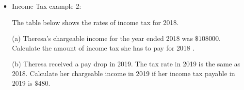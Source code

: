 \documentclass[twocolumn]{article}
\begin{document}
\begin{itemize}
(a) 

Matthew:

Tax on the first $\$ 20000=\$ 0$

Tax on the next $\$ 8500=\frac{2}{100} \times \$ 8500=\$ 170$

Total tax $=\$ 0+\$ 170=\$ 170$

$\therefore \quad$ Matthew has to pay $\$ 170$ of tax.

Tom:

Tax on the first $\$ 30000=\$ 200$

Tax on the next $\$ 7400=\frac{3.5}{100} \times \$ 7400=\$ 259$

Total tax $=\$ 200+\$ 259=\$ 459$

$\therefore$ Tom has to pay $\$ 459$ of tax.

(b)

Irene:

$
\begin{aligned}
	& \text { Tax on the first } \$ 30000=\$ 200 \\
	& \begin{aligned}
		\text { Tax on the remainder } & =\$ 499.60-\$ 200 \\
		& =\$ 299.60
	\end{aligned}
\end{aligned}
$

Let $\$ x$ be the remainder.

$
\begin{aligned}
	\frac{3.5}{100} \times \$ x & =\$ 299.60 \\
	\$ x & =\frac{100}{3.5} \times \$ 299.60 \\
	& =\$ 8560
\end{aligned}
$

Annual chargeable income last year

$
\begin{aligned}
	& =\$ 30000+\$ 8560 \\
	& =\$ 38560
\end{aligned}
$

\item Income Tax example 2:

The table below shows the rates of income tax for 2018.

(a) Theresa's chargeable income for the year ended 2018 was $\$ 108000$. Calculate the amount of income tax she has to pay for 2018 .

(b) Theresa received a pay drop in 2019. The tax rate in 2019 is the same as 2018. Calculate her chargeable income in 2019 if her income tax payable in 2019 is $\$ 480$.


\end{itemize}
\end{document}
